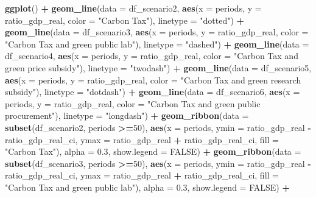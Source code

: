 \documentclass[
]{article}
\newenvironment{Shaded}{\begin{snugshade}}{\end{snugshade}}
\newcommand{\AttributeTok}[1]{\textcolor[rgb]{0.13,0.29,0.53}{#1}}
\newcommand{\ConstantTok}[1]{\textcolor[rgb]{0.56,0.35,0.01}{#1}}
\newcommand{\DecValTok}[1]{\textcolor[rgb]{0.00,0.00,0.81}{#1}}
\newcommand{\FloatTok}[1]{\textcolor[rgb]{0.00,0.00,0.81}{#1}}
\newcommand{\FunctionTok}[1]{\textcolor[rgb]{0.13,0.29,0.53}{\textbf{#1}}}
\newcommand{\NormalTok}[1]{#1}
\newcommand{\SpecialCharTok}[1]{\textcolor[rgb]{0.81,0.36,0.00}{\textbf{#1}}}
\newcommand{\StringTok}[1]{\textcolor[rgb]{0.31,0.60,0.02}{#1}}
\begin{document}
\begin{Shaded}
\begin{Highlighting}[]
\FunctionTok{ggplot}\NormalTok{() }\SpecialCharTok{+}
  \FunctionTok{geom\_line}\NormalTok{(}\AttributeTok{data =}\NormalTok{ df\_scenario2, }\FunctionTok{aes}\NormalTok{(}\AttributeTok{x =}\NormalTok{ periods, }\AttributeTok{y =}\NormalTok{ ratio\_gdp\_real, }\AttributeTok{color =} \StringTok{"Carbon Tax"}\NormalTok{), }\AttributeTok{linetype =} \StringTok{"dotted"}\NormalTok{) }\SpecialCharTok{+}
  \FunctionTok{geom\_line}\NormalTok{(}\AttributeTok{data =}\NormalTok{ df\_scenario3, }\FunctionTok{aes}\NormalTok{(}\AttributeTok{x =}\NormalTok{ periods, }\AttributeTok{y =}\NormalTok{ ratio\_gdp\_real, }\AttributeTok{color =} \StringTok{"Carbon Tax and green public lab"}\NormalTok{), }\AttributeTok{linetype =} \StringTok{"dashed"}\NormalTok{) }\SpecialCharTok{+}
  \FunctionTok{geom\_line}\NormalTok{(}\AttributeTok{data =}\NormalTok{ df\_scenario4, }\FunctionTok{aes}\NormalTok{(}\AttributeTok{x =}\NormalTok{ periods, }\AttributeTok{y =}\NormalTok{ ratio\_gdp\_real, }\AttributeTok{color =} \StringTok{"Carbon Tax and green price subsidy"}\NormalTok{), }\AttributeTok{linetype =} \StringTok{"twodash"}\NormalTok{) }\SpecialCharTok{+}
  \FunctionTok{geom\_line}\NormalTok{(}\AttributeTok{data =}\NormalTok{ df\_scenario5, }\FunctionTok{aes}\NormalTok{(}\AttributeTok{x =}\NormalTok{ periods, }\AttributeTok{y =}\NormalTok{ ratio\_gdp\_real, }\AttributeTok{color =} \StringTok{"Carbon Tax and green research subsidy"}\NormalTok{), }\AttributeTok{linetype =} \StringTok{"dotdash"}\NormalTok{) }\SpecialCharTok{+}
  \FunctionTok{geom\_line}\NormalTok{(}\AttributeTok{data =}\NormalTok{ df\_scenario6, }\FunctionTok{aes}\NormalTok{(}\AttributeTok{x =}\NormalTok{ periods, }\AttributeTok{y =}\NormalTok{ ratio\_gdp\_real, }\AttributeTok{color =} \StringTok{"Carbon Tax and green public procurement"}\NormalTok{), }\AttributeTok{linetype =} \StringTok{"longdash"}\NormalTok{) }\SpecialCharTok{+}
  \FunctionTok{geom\_ribbon}\NormalTok{(}\AttributeTok{data =} \FunctionTok{subset}\NormalTok{(df\_scenario2, periods }\SpecialCharTok{\textgreater{}=}\DecValTok{50}\NormalTok{), }\FunctionTok{aes}\NormalTok{(}\AttributeTok{x =}\NormalTok{ periods, }\AttributeTok{ymin =}\NormalTok{ ratio\_gdp\_real }\SpecialCharTok{{-}}\NormalTok{ ratio\_gdp\_real\_ci, }\AttributeTok{ymax =}\NormalTok{ ratio\_gdp\_real }\SpecialCharTok{+}\NormalTok{ ratio\_gdp\_real\_ci, }\AttributeTok{fill =} \StringTok{"Carbon Tax"}\NormalTok{), }\AttributeTok{alpha =} \FloatTok{0.3}\NormalTok{, }\AttributeTok{show.legend =} \ConstantTok{FALSE}\NormalTok{) }\SpecialCharTok{+}
  \FunctionTok{geom\_ribbon}\NormalTok{(}\AttributeTok{data =} \FunctionTok{subset}\NormalTok{(df\_scenario3, periods }\SpecialCharTok{\textgreater{}=}\DecValTok{50}\NormalTok{), }\FunctionTok{aes}\NormalTok{(}\AttributeTok{x =}\NormalTok{ periods, }\AttributeTok{ymin =}\NormalTok{ ratio\_gdp\_real }\SpecialCharTok{{-}}\NormalTok{ ratio\_gdp\_real\_ci, }\AttributeTok{ymax =}\NormalTok{ ratio\_gdp\_real }\SpecialCharTok{+}\NormalTok{ ratio\_gdp\_real\_ci, }\AttributeTok{fill =} \StringTok{"Carbon Tax and green public lab"}\NormalTok{), }\AttributeTok{alpha =} \FloatTok{0.3}\NormalTok{, }\AttributeTok{show.legend =} \ConstantTok{FALSE}\NormalTok{) }\SpecialCharTok{+}

\end{Highlighting}
\end{Shaded}
\end{document}
